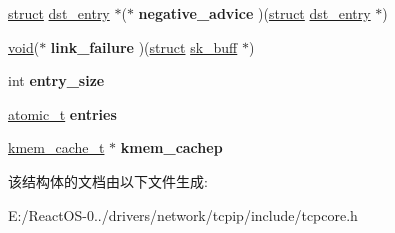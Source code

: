 \begin{DoxyCompactItemize}
\mbox{\label{structdst__ops_a8fb0476debe3765fc5a9c50762170ba7}} 
\hyperlink{interfacestruct}{struct} \hyperlink{structdst__entry}{dst\+\_\+entry} $\ast$($\ast$ {\bfseries negative\+\_\+advice} )(\hyperlink{interfacestruct}{struct} \hyperlink{structdst__entry}{dst\+\_\+entry} $\ast$)
\item 
\mbox{\label{structdst__ops_a4d3d61aad01abf20d2de2faea5d16ff6}} 
\hyperlink{interfacevoid}{void}($\ast$ {\bfseries link\+\_\+failure} )(\hyperlink{interfacestruct}{struct} \hyperlink{structsk__buff}{sk\+\_\+buff} $\ast$)
\item 
\mbox{\label{structdst__ops_a042d8c8bb26c4ca26471fc98b45c0b4d}} 
int {\bfseries entry\+\_\+size}
\item 
\mbox{\label{structdst__ops_a86ff70947375bfea39f6056b06747530}} 
\hyperlink{structatomic__t}{atomic\+\_\+t} {\bfseries entries}
\item 
\mbox{\label{structdst__ops_a91443eae5ad464c204cbff3094623db5}} 
\hyperlink{structkmem__cache}{kmem\+\_\+cache\+\_\+t} $\ast$ {\bfseries kmem\+\_\+cachep}
\end{DoxyCompactItemize}


该结构体的文档由以下文件生成\+:\begin{DoxyCompactItemize}
\item 
E\+:/\+React\+O\+S-\/0../drivers/network/tcpip/include/tcpcore.\+h\end{DoxyCompactItemize}
